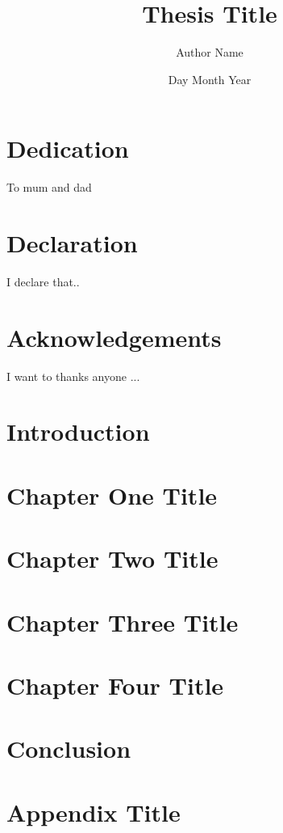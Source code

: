 \documentclass[12pt,twoside]{report}
\title{Thesis Title}
\author{Author Name}
\date{Day Month Year}
\begin{document}
	

	

	\chapter*{Dedication}
	To mum and dad

	\chapter*{Declaration}
	I declare that..

	\chapter*{Acknowledgements}
	I want to thanks anyone ...

	\tableofcontents

	\listoffigures

	\listoftables

	\nocite{*} %
	\printbibliography[
		heading=bibintoc,
	]

	\clearpage
	\chapter*{Introduction}
	

	\chapter{Chapter One Title}
	

	\chapter{Chapter Two Title}
	

	\chapter{Chapter Three Title}
	

	\chapter{Chapter Four Title}
	

	\chapter{Conclusion}
	

	\appendix
	\chapter{Appendix Title}
	
\end{document}
